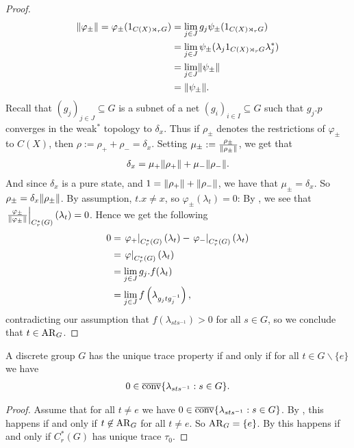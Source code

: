 \begin{theorem}
\begin{proof}
\begin{align*}
\lVert \varphi_{\pm} \rVert = \varphi_{\pm}( 1_{C(X) \rtimes_r G}) &=\lim_{j \in J} g_j \psi_{\pm}(1_{C(X) \rtimes_r G})\\
&=\lim_{j \in J} \psi_{\pm}(\lambda_j 1_{C(X) \rtimes_r G} \lambda_j^*)\\
&=\lim_{j \in J} \lVert \psi_{\pm} \rVert\\
&= \lVert \psi_{\pm} \rVert.
\end{align*}
Recall that $(g_j)_{j \in J} \subseteq G$ is a subnet of a net $(g_{i})_{i \in I} \subseteq G$ such that $g_j.p$ converges in the weak$^*$ topology to $\delta_x$. Thus if $\rho_{\pm}$ denotes the restrictions of $\varphi_{\pm}$ to $C(X)$, then $\rho:=\rho_+ + \rho_- = \delta_x$. Setting $\mu_{\pm}:= \frac{\rho_{\pm}}{\lVert \rho_{\pm}\rVert}$, we get that 
\begin{align*}
\delta_x= \mu_+ \lVert \rho_+ \rVert + \mu_- \lVert \rho_-\rVert.
\end{align*} 
And since $\delta_x$ is a pure state, and $1= \lVert \rho_+\rVert + \lVert \rho_{-} \rVert$, we have that $\mu_{\pm}= \delta_x$. So $\rho_{\pm}= \delta_x \lVert \rho_{\pm} \rVert$. By assumption, $t .x \neq x$, so $\varphi_{\pm} (\lambda_t)=0$: By , we see that$\left.\frac{\varphi_{\pm}}{\lVert \varphi_{\pm} \rVert}\right|_{C_r^*(G)}( \lambda_t)=0$. Hence we get the following
%
%
\begin{align*}
0 &= \left.\varphi_+\right|_{C_r^*(G)} ( \lambda_t) - \left.\varphi_-\right|_{C_r^*(G)} ( \lambda_t) \\
&= \left.\varphi\right|_{C_r^*(G)} (\lambda_t)\\
&=\lim_{j \in J} g_j . f(\lambda_t)\\
&= \lim_{j \in J}  f\left(\lambda_{g_j t g_j^{-1}}\right),
\end{align*}
contradicting our assumption that $f(\lambda_{sts^{-1}}) >0$ for all $s \in G$, so we conclude that $t \in \operatorname{AR}_G$.
\end{proof}
\end{theorem}

\begin{corollary}\label{unique trace iff 0 in conv}
A discrete group $G$ has the unique trace property if and only if for all $t \in G\backslash \{e \}$ we have
\begin{align*}
0 \in \overline{\operatorname{conv}}\{\lambda_{sts^{-1}} : s \in G\}.
\end{align*}
\begin{proof}
Assume that for all $t \neq e$ we have $0 \in \overline{\operatorname{conv}}\{\lambda_{sts^{-1}} : s \in G\}$. By , this happens if and only if $t \not \in \operatorname{AR}_G$ for all $t \neq e$. So $\operatorname{AR}_G= \{ e \}$. By  this happens if and only if $C_r^*(G)$ has unique trace $\tau_0$.
\end{proof}
\end{corollary}


